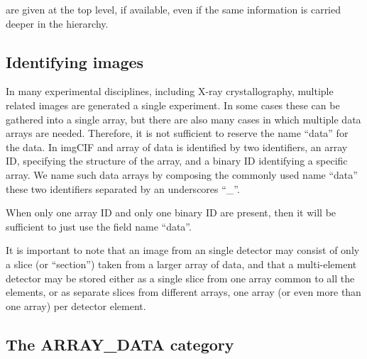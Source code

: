 \documentclass[11pt]{article}
\begin{document}
are given at the top level, if available, even if the same information is carried
deeper in the hierarchy. 
  

\subsection{Identifying images}
\label{Identifying images}

In many experimental disciplines, including X-ray crystallography, multiple
related images are generated a single experiment.  In some cases these
can be gathered into a single array, but there are also many cases in
which multiple data arrays are needed.  Therefore, it is not sufficient
to reserve the name ``data'' for the data.  In imgCIF and array of
data is identified by two identifiers, an array ID, specifying the
structure of the array, and a binary ID identifying a specific
array.  We name such data arrays by composing the commonly used
name ``data'' these two identifiers separated by an underscores ``\_''.

When only one array ID and only one binary ID are present, then it
will be sufficient to just use the field name ``data''.

It is important to note that an image from an single detector
may consist of only a slice (or ``section'') taken from a larger
array of data, and that a multi-element detector
may be stored either as a single slice from one array common to all the
elements, or as separate slices from different arrays, one array (or even
more than one array) per detector element.


\subsection{The ARRAY\_DATA category}
\end{document}
